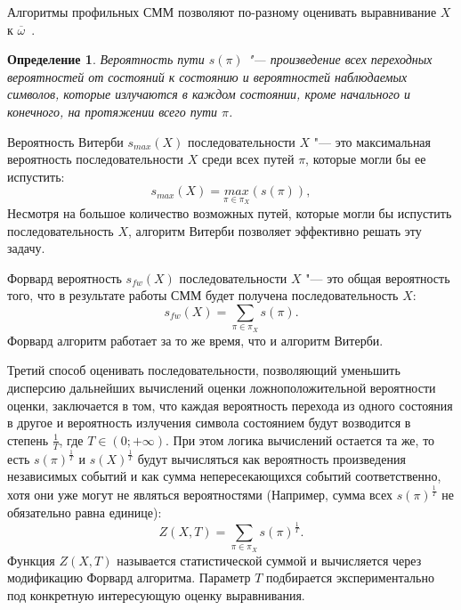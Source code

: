 \documentclass[specialist,
substylefile = spbu_report.rtx,
subf,href,colorlinks=true, 12pt]{disser}
\newtheorem{defenition}{Определение}
\begin{document}
				Алгоритмы профильных СММ позволяют по-разному оценивать выравнивание $X$ к  $\overline{\omega}$~\cite{Newberg2009, Compeau2015a}. 
				
				\begin{defenition}
					Вероятность пути $s(\pi)$ "--- произведение всех переходных вероятностей от состояний к состоянию и вероятностей наблюдаемых символов, которые излучаются в каждом состоянии, кроме начального и конечного, на протяжении всего пути $\pi$. 
				\end{defenition}
				
				Вероятность Витерби $s_{max}(X)$ последовательности $X$ "--- это максимальная вероятность последовательности $X$ среди всех путей $\pi$, которые могли бы ее испустить:
				\begin{equation*}
					s_{max}(X) = \underset{\pi \in \pi_{X}}{max}(s(\pi)),
					\label{eq:3}
				\end{equation*}
				Несмотря на большое количество возможных путей, которые могли бы испустить последовательность $X$, алгоритм Витерби позволяет эффективно решать эту задачу.
				
				Форвард вероятность $s_{fw}(X)$ последовательности $X$ "--- это общая вероятность того, что в результате работы СММ будет получена последовательность $X$:
				\begin{equation*}
					s_{fw}(X) = \sum_{\pi \in \pi_{X}}s(\pi).
					\label{eq:4}
				\end{equation*}		
				Форвард алгоритм работает за то же время, что и алгоритм Витерби.
				
				Третий способ оценивать последовательности, позволяющий уменьшить дисперсию дальнейших вычислений оценки ложноположительной вероятности оценки, заключается в том, что каждая вероятность перехода из одного состояния в другое и вероятность излучения символа состоянием будут возводится в степень $\frac{1}{T}$, где $T \in (0; +\infty)$. При этом логика вычислений остается та же, то есть $s(\pi)^{\frac{1}{T}}$ и $s(X)^{\frac{1}{T}}$ будут вычисляться как вероятность произведения независимых событий и как сумма непересекающихся событий соответственно, хотя они уже могут не являться вероятностями (Например, сумма всех $s(\pi)^\frac{1}{T}$ не обязательно равна единице):
				\begin{equation*}
					Z(X, T)	= \sum_{\pi \in \pi_{X}}s(\pi)^{\frac{1}{T}}.
					\label{eq:5}
				\end{equation*}		
				Функция $Z(X, T)$ называется статистической суммой и вычисляется через модификацию Форвард алгоритма. Параметр $T$ подбирается экспериментально под конкретную интересующую оценку выравнивания.
\end{document}
